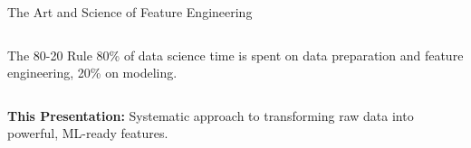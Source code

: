 \documentclass[aspectratio=169,11pt]{beamer}
\begin{document}
\begin{frame}{The Art and Science of Feature Engineering}
\begin{columns}
\begin{column}{0.4\textwidth}
\begin{figure}
\end{figure}

\begin{alertblock}{The 80-20 Rule}
80\% of data science time is spent on data preparation and feature engineering, 20\% on modeling.
\end{alertblock}
\end{column}
\end{columns}

\vspace{0.3cm}
\textbf{This Presentation:} Systematic approach to transforming raw data into powerful, ML-ready features.
\end{frame}
\end{document}
